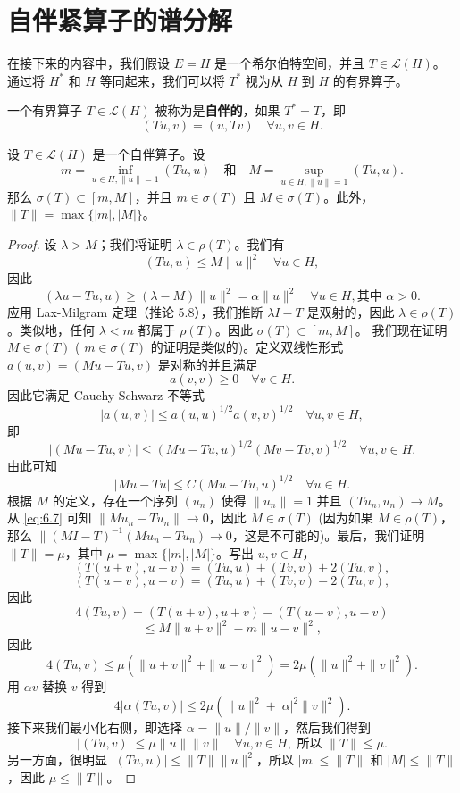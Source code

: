 \section{自伴紧算子的谱分解}

在接下来的内容中，我们假设 \(E=H\) 是一个希尔伯特空间，并且 \(T \in \mathcal{L}(H)\)。通过将 \(H^*\) 和 \(H\) 等同起来，我们可以将 \(T^*\) 视为从 \(H\) 到 \(H\) 的有界算子。

\begin{definition}
一个有界算子 \(T \in \mathcal{L}(H)\) 被称为是\textbf{自伴的}，如果 \(T^*=T\)，即
\[
(Tu, v) = (u, Tv) \quad \forall u, v \in H.
\]
\end{definition}

\begin{proposition}\label{proposition:6.9}
设 \(T \in \mathcal{L}(H)\) 是一个自伴算子。设
\[
m = \inf_{u \in H, \|u\|=1} (Tu, u) \quad \text{和} \quad M = \sup_{u \in H, \|u\|=1} (Tu, u).
\]
那么 \(\sigma(T) \subset [m, M]\)，并且 \(m \in \sigma(T)\) 且 \(M \in \sigma(T)\)。此外，\(\|T\| = \max\{|m|, |M|\}\)。
\end{proposition}

\begin{proof}
设 \(\lambda > M\)；我们将证明 \(\lambda \in \rho(T)\)。我们有
\[
(Tu, u) \le M \|u\|^2 \quad \forall u \in H,
\]
因此
\[
(\lambda u - Tu, u) \ge (\lambda - M)\|u\|^2 = \alpha \|u\|^2 \quad \forall u \in H, \text{其中 } \alpha > 0.
\]
应用 Lax-Milgram 定理（推论 5.8），我们推断 \(\lambda I - T\) 是双射的，因此 \(\lambda \in \rho(T)\)。类似地，任何 \(\lambda < m\) 都属于 \(\rho(T)\)。因此 \(\sigma(T) \subset [m, M]\)。
我们现在证明 \(M \in \sigma(T)\) ( \(m \in \sigma(T)\) 的证明是类似的)。定义双线性形式 \(a(u,v) = (Mu - Tu, v)\) 是对称的并且满足
\[
a(v,v) \ge 0 \quad \forall v \in H.
\]
因此它满足 Cauchy-Schwarz 不等式
\[
|a(u,v)| \le a(u,u)^{1/2} a(v,v)^{1/2} \quad \forall u, v \in H,
\]
即
\[
|(Mu - Tu, v)| \le (Mu - Tu, u)^{1/2} (Mv - Tv, v)^{1/2} \quad \forall u, v \in H.
\]
由此可知
\begin{equation}\label{eq:6.7}
|Mu - Tu| \le C (Mu - Tu, u)^{1/2} \quad \forall u \in H.
\end{equation}
根据 \(M\) 的定义，存在一个序列 \((u_n)\) 使得 \(\|u_n\|=1\) 并且 \((Tu_n, u_n) \to M\)。从 \eqref{eq:6.7} 可知 \(\|Mu_n - Tu_n\| \to 0\)，因此 \(M \in \sigma(T)\) (因为如果 \(M \in \rho(T)\)，那么 \(\| (MI-T)^{-1}(Mu_n - Tu_n) \to 0\)，这是不可能的)。最后，我们证明 \(\|T\| = \mu\)，其中 \(\mu = \max\{|m|, |M|\}\)。写出 \(u, v \in H\)，
\[
(T(u+v), u+v) = (Tu, u) + (Tv, v) + 2(Tu, v),
\]
\[
(T(u-v), u-v) = (Tu, u) + (Tv, v) - 2(Tu, v),
\]
因此
\[
4(Tu, v) = (T(u+v), u+v) - (T(u-v), u-v)
\]
\[
\le M\|u+v\|^2 - m\|u-v\|^2,
\]
因此
\[
4(Tu, v) \le \mu(\|u+v\|^2 + \|u-v\|^2) = 2\mu(\|u\|^2 + \|v\|^2).
\]
用 \(\alpha v\) 替换 \(v\) 得到
\[
4|\alpha (Tu, v)| \le 2\mu \left( \|u\|^2 + |\alpha|^2 \|v\|^2 \right).
\]
接下来我们最小化右侧，即选择 \(\alpha = \|u\|/\|v\|\)，然后我们得到
\[
|(Tu, v)| \le \mu \|u\| \|v\| \quad \forall u, v \in H, \text{ 所以 } \|T\| \le \mu.
\]
另一方面，很明显 \(|(Tu, u)| \le \|T\| \|u\|^2\)，所以 \(|m| \le \|T\|\) 和 \(|M| \le \|T\|\)，因此 \(\mu \le \|T\|\)。
\end{proof}

